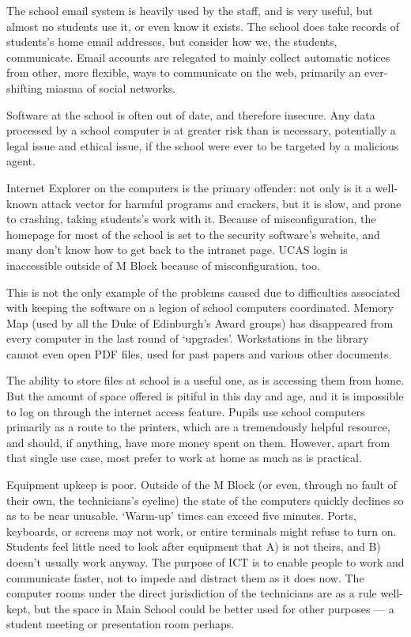 \documentclass[a4paper,leqno,titlepage]{article}
\begin{document}
The school email system is heavily used by the staff, and is very useful, but
almost no students use it, or even know it exists. The school does take records
of students's home email addresses, but consider how we, the students,
communicate. Email accounts are relegated to mainly collect automatic notices
from other, more flexible, ways to communicate on the web, primarily an
ever-shifting miasma of social networks.


Software at the school is often out of date, and therefore insecure.
Any data processed by a school computer is at greater risk than is necessary,
potentially a legal issue and ethical issue, if the school were ever to be
targeted by a malicious agent.


Internet Explorer on the computers is the primary offender: not only is it
a well-known attack vector for harmful programs and crackers, but it is slow, and
prone to crashing, taking students's work with it. Because of misconfiguration,
the homepage for most of the school is set to the security software's website,
and many don't know how to get back to the intranet page. UCAS login is
inaccessible outside of M Block because of misconfiguration, too.


This is not the only example of the problems caused due to difficulties
associated with keeping the software on a legion of school computers
coordinated. Memory Map (used by all the Duke of Edinburgh's Award groups) has
disappeared from every computer in the last round of `upgrades'. Workstations
in the library cannot even open PDF files, used for past papers and various
other documents.

The ability to store files at school is a useful one, as is accessing them from
home. But the amount of space offered is pitiful in this day and age, and it is
impossible to log on through the internet access feature.
Pupils use school computers primarily as a route to the printers, which are a
tremendously helpful resource, and should, if anything, have more money spent on them.
However, apart from that single use case,
most prefer to work at home as much as is practical.


Equipment upkeep is poor. Outside of the M Block (or even, through no fault of
their own, the technicians's eyeline) the state of the computers quickly declines
so as to be near unusable. `Warm-up' times can exceed five minutes. Ports, keyboards,
or screens may not work, or entire terminals might refuse to turn on.
Students feel little need to look after equipment that A) is not theirs,
and B) doesn't usually work anyway. The purpose of ICT is to enable
people to work and communicate faster, not to impede and distract them as it
does now. The computer rooms under the direct jurisdiction of the
technicians are as a rule well-kept, but the space in Main School could be
better used for other purposes --- a student meeting or presentation room perhaps.
\end{document}
